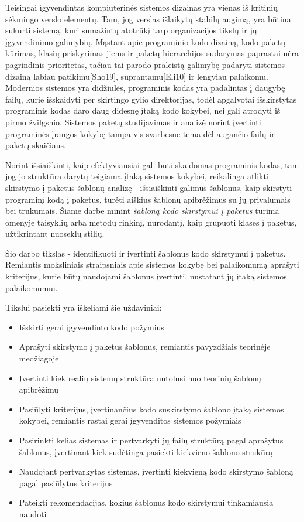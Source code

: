 Teisingai įgyvendintas kompiuterinės sistemos dizainas yra vienas iš kritinių sėkmingo verslo
elementų.
Tam, jog verslas išlaikytų stabilų augimą, yra būtina sukurti sistemą, kuri sumažintų
atotrūkį tarp organizacijos tikslų ir jų įgyvendinimo galimybių.
Mąstant apie programinio kodo
dizainą, kodo paketų kūrimas, klasių priskyrimas jiems ir paketų hierarchijos sudarymas paprastai
nėra pagrindinis prioritetas, tačiau tai parodo praleistą galimybę padaryti sistemos dizainą labiau
patikimu[Sho19], suprantamu[Eli10] ir lengviau palaikomu.
Modernios sistemos yra didžiulės, programinis kodas yra padalintas į daugybę failų,
kurie išskaidyti per skirtingo gylio direktorijas, todėl apgalvotai išskirstytas programinis
kodas daro daug didesnę įtaką kodo kokybei, nei gali atrodyti iš pirmo žvilgsnio.
Sistemos paketų studijavimas ir analizė norint įvertinti programinės įrangos kokybę
tampa vis svarbesne tema dėl augančio failų ir paketų skaičiaus\cite{DesignMetrics}.

Norint išsiaiškinti, kaip efektyviausiai gali būti skaidomas programinis
kodas, tam jog jo struktūra darytų teigiama įtaką sistemos kokybei, reikalinga atlikti skirstymo į paketus šablonų analizę -
išsiaiškinti galimus šablonus, kaip skirstyti programinį kodą į paketus, turėti aiškius šablonų apibrėžimus su jų
privalumais bei trūkumais.
Šiame darbe minint \textit{šabloną kodo skirstymui į paketus} turima omenyje taisyklių arba metodų rinkinį, nurodantį, kaip grupuoti klases į paketus, užtikrintant nuoseklų stilių.

Šio darbo tikslas - identifikuoti ir ivertinti šablonus kodo skirstymui į paketus.
Remiantis moksliniais straipsniais apie sistemos kokybę bei palaikomumą aprašyti kriterijus,
kurie būtų naudojami šablonus įvertinti, nustatant jų įtaką sistemos palaikomumui.

Tikslui pasiekti yra iškeliami šie uždaviniai:
\begin{itemize}
    \item Išskirti gerai įgyvendinto kodo požymius
    \item  Aprašyti skirstymo į paketus šablonus, remiantis pavyzdžiais teorinėje medžiagoje
    \item  Įvertinti kiek realių sistemų struktūra nutolusi nuo teorinių šablonų apibrėžimų
    \item  Pasiūlyti kriterijus, įvertinančius kodo suskirstymo šablono įtaką sistemos kokybei, remiantis
rastai gerai įgyvenditos sistemos požymiais
    \item  Pasirinkti kelias sistemas ir pertvarkyti jų failų struktūrą pagal aprašytus šablonus, įvertinant
kiek sudėtinga pasiekti kiekvieno šablono strukūrą
    \item  Naudojant pertvarkytas sistemas, įvertinti kiekvieną kodo skirstymo šabloną pagal pasiūlytus kriterijus
    \item  Pateikti rekomendacijas, kokius šablonus kodo skirstymui tinkamiausia naudoti
\end{itemize}

